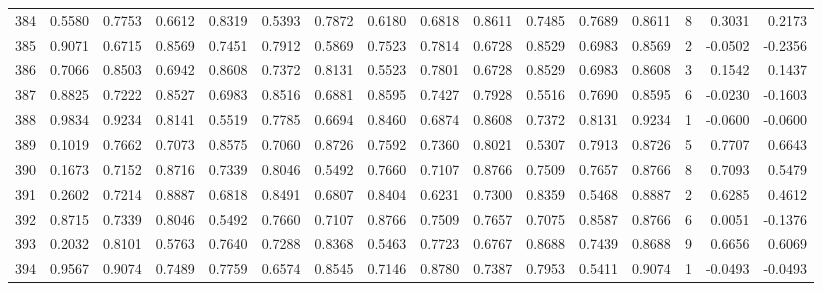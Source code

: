 \begin{tabular}{lrrrrrrrrrrrrrrr}
384 &      0.5580 &  0.7753 &  0.6612 &  0.8319 &  0.5393 &  0.7872 &  0.6180 &  0.6818 &  0.8611 &  0.7485 &   0.7689 &     0.8611 &      8 &                    0.3031 &                     0.2173 \\
385 &      0.9071 &  0.6715 &  0.8569 &  0.7451 &  0.7912 &  0.5869 &  0.7523 &  0.7814 &  0.6728 &  0.8529 &   0.6983 &     0.8569 &      2 &                   -0.0502 &                    -0.2356 \\
386 &      0.7066 &  0.8503 &  0.6942 &  0.8608 &  0.7372 &  0.8131 &  0.5523 &  0.7801 &  0.6728 &  0.8529 &   0.6983 &     0.8608 &      3 &                    0.1542 &                     0.1437 \\
387 &      0.8825 &  0.7222 &  0.8527 &  0.6983 &  0.8516 &  0.6881 &  0.8595 &  0.7427 &  0.7928 &  0.5516 &   0.7690 &     0.8595 &      6 &                   -0.0230 &                    -0.1603 \\
388 &      0.9834 &  0.9234 &  0.8141 &  0.5519 &  0.7785 &  0.6694 &  0.8460 &  0.6874 &  0.8608 &  0.7372 &   0.8131 &     0.9234 &      1 &                   -0.0600 &                    -0.0600 \\
389 &      0.1019 &  0.7662 &  0.7073 &  0.8575 &  0.7060 &  0.8726 &  0.7592 &  0.7360 &  0.8021 &  0.5307 &   0.7913 &     0.8726 &      5 &                    0.7707 &                     0.6643 \\
390 &      0.1673 &  0.7152 &  0.8716 &  0.7339 &  0.8046 &  0.5492 &  0.7660 &  0.7107 &  0.8766 &  0.7509 &   0.7657 &     0.8766 &      8 &                    0.7093 &                     0.5479 \\
391 &      0.2602 &  0.7214 &  0.8887 &  0.6818 &  0.8491 &  0.6807 &  0.8404 &  0.6231 &  0.7300 &  0.8359 &   0.5468 &     0.8887 &      2 &                    0.6285 &                     0.4612 \\
392 &      0.8715 &  0.7339 &  0.8046 &  0.5492 &  0.7660 &  0.7107 &  0.8766 &  0.7509 &  0.7657 &  0.7075 &   0.8587 &     0.8766 &      6 &                    0.0051 &                    -0.1376 \\
393 &      0.2032 &  0.8101 &  0.5763 &  0.7640 &  0.7288 &  0.8368 &  0.5463 &  0.7723 &  0.6767 &  0.8688 &   0.7439 &     0.8688 &      9 &                    0.6656 &                     0.6069 \\
394 &      0.9567 &  0.9074 &  0.7489 &  0.7759 &  0.6574 &  0.8545 &  0.7146 &  0.8780 &  0.7387 &  0.7953 &   0.5411 &     0.9074 &      1 &                   -0.0493 &                    -0.0493 \\

\end{tabular}
